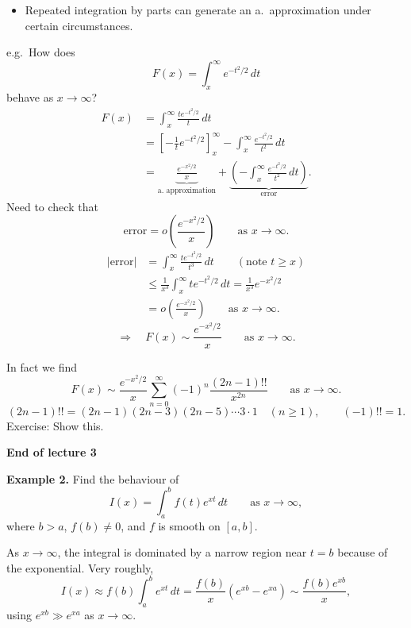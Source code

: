 \documentclass[11pt,a4paper]{article}
\begin{document}
\begin{itemize}
    \item Repeated integration by parts can generate an a.\ approximation
    under certain circumstances.
\end{itemize}
e.g.\ How does
\[
    F(x)=\int_x^\infty e^{-t^2/2}\,dt
\]
behave as $x\to\infty$?
\begin{align*}
    F(x)&=\int_x^\infty\frac{te^{-t^2/2}}{t}\,dt\\
    &=\left[-\frac{1}{t}e^{-t^2/2}\right]_x^\infty
    -\int_x^\infty\frac{e^{-t^2/2}}{t^2}\,dt\\
    &=\underbrace{\frac{e^{-x^2/2}}{x}}_{\text{a.\ approximation}}
    +\underbrace{\left(-\int_x^\infty\frac{e^{-t^2/2}}{t^2}\,dt\right)}_{\text{error}}.
\end{align*}
Need to check that
\[
    \text{error}=o\!\left(\frac{e^{-x^2/2}}{x}\right)
    \qquad\text{as }x\to\infty.
\]
\begin{align*}
    |\text{error}|&=\int_x^\infty\frac{te^{-t^2/2}}{t^3}\,dt
    \qquad(\text{note }t\geq x)\\
    &\leq\frac{1}{x^3}\int_x^\infty te^{-t^2/2}\,dt
    =\frac{1}{x^3}e^{-x^2/2}\\
    &=o\!\left(\frac{e^{-x^2/2}}{x}\right)
    \qquad\text{as }x\to\infty.
\end{align*}
\[
    \Rightarrow\quad F(x)\sim\frac{e^{-x^2/2}}{x}
    \qquad\text{as }x\to\infty.
\]

In fact we find
\[
    F(x)\sim\frac{e^{-x^2/2}}{x}
    \sum_{n=0}^\infty(-1)^n\frac{(2n-1)!!}{x^{2n}}
    \qquad\text{as }x\to\infty.
\]
\[
    (2n-1)!!=(2n-1)(2n-3)(2n-5)\cdots3\cdot1
    \quad(n\geq1),\qquad (-1)!!=1.
\]
Exercise: Show this.

\begin{center}
    \textbf{End of lecture 3}
\end{center}

\noindent\textbf{Example 2.}
Find the behaviour of
\[
    I(x)=\int_a^b f(t)e^{xt}\,dt
    \qquad\text{as }x\to\infty,
\]
where $b>a$, $f(b)\neq0$, and $f$ is smooth on $[a,b]$.

As $x\to\infty$, the integral is dominated by a narrow region near $t=b$
because of the exponential. Very roughly,
\[
    I(x)\approx f(b)\int_a^b e^{xt}\,dt
    =\frac{f(b)}{x}(e^{xb}-e^{xa})
    \sim\frac{f(b)e^{xb}}{x},
\]
using $e^{xb}\gg e^{xa}$ as $x\to\infty$.
\end{document}
